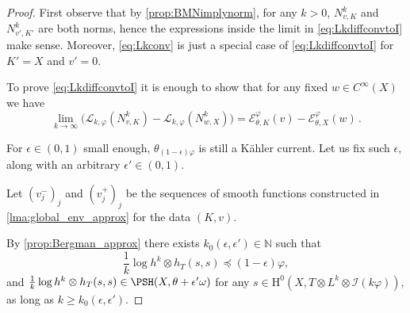 \begin{proof}
First observe that by \cref{prop:BMNimplynorm}, for any $k>0$, $N^k_{v,K}$ and $N^k_{v',K'}$ are both norms, hence the expressions inside the limit in \eqref{eq:LkdiffconvtoI} make sense. Moreover, \eqref{eq:Lkconv} is just a special case of \eqref{eq:LkdiffconvtoI} for $K'=X$ and $v'= 0$.

To prove \eqref{eq:LkdiffconvtoI} it is enough to show that for any fixed $w \in C^\infty(X)$ we have
\begin{equation}\label{eq:inproofLdiffsmw}
\lim_{k\to\infty} \big( \mathcal{L}_{k,\varphi}(N^k_{v,K}) - \mathcal{L}_{k,\varphi}(N^k_{w,X}) \big) = \mathcal{E}_{\theta,K}^{\varphi}(v) - \mathcal{E}_{\theta,X}^{\varphi}(w)\,.
\end{equation}


For $\epsilon \in (0,1)$ small enough, $\theta_{(1-\epsilon)\varphi}$ is still a Kähler current. Let us fix such $\epsilon$, along with an arbitrary $\epsilon' \in (0,1)$.

Let $(v^-_{j})_j$ and $(v^+_{j})_j$ be the sequences of smooth functions constructed in \cref{lma:global_env_approx} for the data $(K,v)$.

By \cref{prop:Bergman_approx} there exists $k_0(\epsilon,\epsilon') \in \mathbb N$ such that
\[
\frac{1}{k} \log h^k \otimes h_T (s,s) \preceq (1-\epsilon)\varphi,
\]
and $\frac{1}{k} \log h^k \otimes h_T (s,s) \in \PSH(X,\theta + \epsilon'\omega)$ for any $s \in \mathrm{H}^0(X,T\otimes L^k \otimes \mathcal{I}(k\varphi))$, as long as $k \geq k_0(\epsilon,\epsilon')$.


\end{proof}

